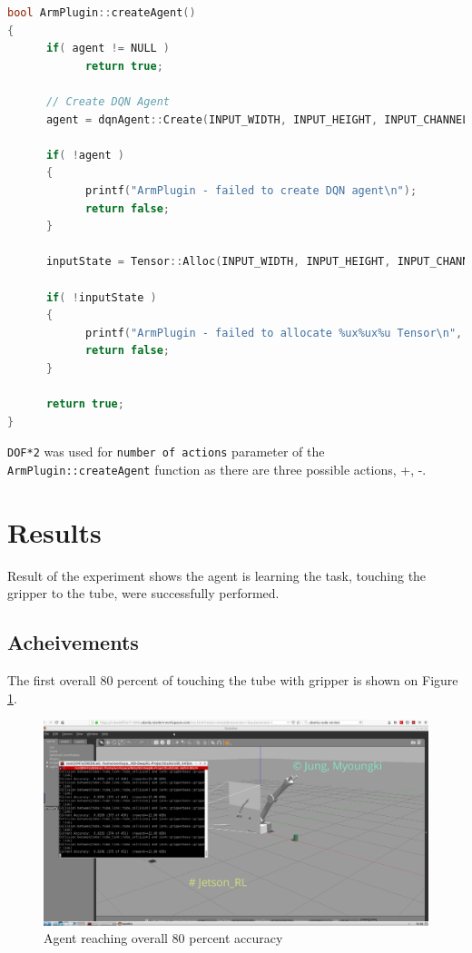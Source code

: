 \documentclass[10pt,journal,compsoc]{IEEEtran}
\begin{document}
\begin{lstlisting}[language=C++, caption={ArmPlugin::createAgent function},label={list:ArmPlugin::createAgent}]
bool ArmPlugin::createAgent()
{
      if( agent != NULL )
            return true;
      
      // Create DQN Agent
      agent = dqnAgent::Create(INPUT_WIDTH, INPUT_HEIGHT, INPUT_CHANNELS, DOF*3, OPTIMIZER, LEARNING_RATE, REPLAY_MEMORY, BATCH_SIZE, GAMMA, EPS_START, EPS_END, EPS_DECAY,USE_LSTM, LSTM_SIZE, ALLOW_RANDOM, DEBUG_DQN);
      
      if( !agent )
      {
            printf("ArmPlugin - failed to create DQN agent\n");
            return false;
      }
           
      inputState = Tensor::Alloc(INPUT_WIDTH, INPUT_HEIGHT, INPUT_CHANNELS);
      
      if( !inputState )
      {
            printf("ArmPlugin - failed to allocate %ux%ux%u Tensor\n", INPUT_WIDTH, INPUT_HEIGHT, INPUT_CHANNELS);
            return false;
      }
      
      return true;
}
\end{lstlisting}

\verb!DOF*2! was used for \verb!number of actions! parameter of the  \verb!ArmPlugin::createAgent! function as there are three possible actions, +, -. 

\section{Results}

Result of the experiment shows the agent is learning the task, touching the gripper to the tube, were successfully performed. 
\subsection{Acheivements}
The first overall 80 percent of touching the tube with gripper is shown on Figure \ref{fig:over80pRLARM}.
\begin{figure}[thpb]
      \centering
      \includegraphics[width=\linewidth]{./img/over80pRLARM.png}
      \caption{Agent reaching overall 80 percent accuracy}
      \label{fig:over80pRLARM}
\end{figure}
\end{document}
